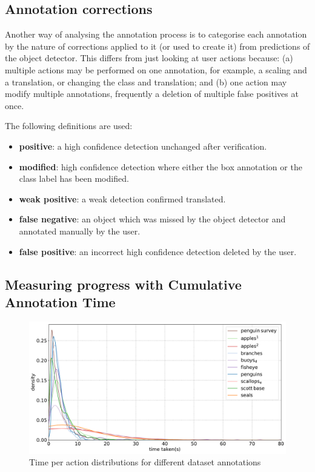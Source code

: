 \subsection{Annotation corrections}
\label{sec:corrections}

Another way of analysing the annotation process is to categorise each annotation by the nature of corrections applied to it (or used to create it) from predictions of the object detector. This differs from just looking at user actions because: (a) multiple actions may be performed on one annotation, for example, a scaling and a translation, or changing the class and translation; and (b) one action may modify multiple annotations, frequently a deletion of multiple false positives at once.

The following definitions are used:

\begin{itemize}
    \item {\bf positive}: a high confidence detection unchanged after verification.
    \item {\bf modified}: high confidence detection where either the box annotation or the class label has been modified.
    \item {\bf weak positive}: a weak detection confirmed translated.    
    \item {\bf false negative}: an object which was missed by the object detector and annotated manually by the user.    
    \item {\bf false positive}: an incorrect high confidence detection deleted by the user.
\end{itemize}

\subsection{Measuring progress with Cumulative Annotation Time}
\label{sec:ann_time}

\begin{figure}[ht!] 
\centering
  \includegraphics[width=1.0\linewidth]{charts/summaries/time_density.pdf}
  \caption{Time per action distributions for different dataset annotations}
  \label{fig:annotation_time_density}
\end{figure}

